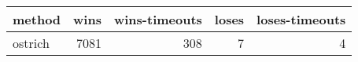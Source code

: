 \begin{tabular}{lrrrr}
\hline
 method   &   wins &   wins-timeouts &   loses &   loses-timeouts \\
\hline
 ostrich  &   7081 &             308 &       7 &                4 \\
\hline
\end{tabular}
